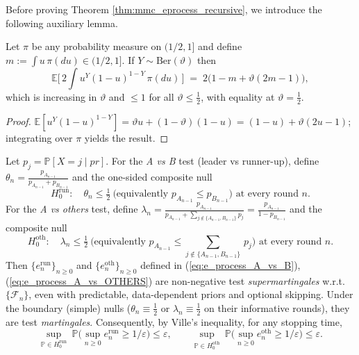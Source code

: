 Before proving Theorem \ref{thm:mmc_eprocess_recursive}, we introduce the following auxiliary lemma.

\begin{lemma}\label{lem:onestep_recursive}
Let $\pi$ be any probability measure on $(1/2,1]$ and define $m:=\int u\,\pi(du)\in(1/2,1]$.
If $Y\sim\mathrm{Ber}(\vartheta)$ then
\[
\mathbb E\!\Big[\,2\!\int u^{Y}(1-u)^{1-Y}\,\pi(du)\,\Big] \;=\; 2\big(1-m+\vartheta(2m-1)\big),
\]
which is increasing in $\vartheta$ and $\le 1$ for all $\vartheta\le \tfrac12$, with equality at $\vartheta=\tfrac12$.
\end{lemma}

\begin{proof}
$\mathbb E[u^{Y}(1-u)^{1-Y}]=\vartheta u + (1-\vartheta)(1-u) = (1-u)+\vartheta(2u-1)$; integrating over $\pi$ yields the result.
\end{proof}

\begin{theorem}
Let $p_j=\mathbb P[X=j\mid pr]$. For the \emph{A vs B} test (leader vs runner-up), define
$\theta_n = \tfrac{p_{A_{n-1}}}{p_{A_{n-1}}+p_{B_{n-1}}}$ and the one-sided composite null
\[
H^{\mathrm{run}}_0:\quad \theta_n \le \tfrac12 \ \big(\text{equivalently $p_{A_{n-1}}\le p_{B_{n-1}}$}\big) \,\,\text{at every round $n$.}
\]
For the \emph{A vs others} test, define
$\lambda_n = \tfrac{p_{A_{n-1}}}{p_{A_{n-1}}+\sum_{j\notin\{A_{n-1},B_{n-1}\}}p_j} = \tfrac{p_{A_{n-1}}}{1-p_{B_{n-1}}}$
and the composite null
\[
H^{\mathrm{oth}}_0:\quad \lambda_n \le \tfrac12 \ \big(\text{equivalently $p_{A_{n-1}}\le \scriptstyle{\sum_{j\notin\{A_{n-1},B_{n-1}\}}}$$\, p_j$}\big) \,\,\text{at every round $n$.}
\]
Then $\{e^{\mathrm{run}}_n\}_{n\ge0}$ and $\{e^{\mathrm{oth}}_n\}_{n\ge0}$ defined in (\ref{eq:e_process_A_vs_B}), (\ref{eq:e_process_A_vs_OTHERS}) are non-negative test
\emph{supermartingales} w.r.t.\ $\{\mathcal F_n\}$, even with predictable, data-dependent priors and optional skipping.
Under the boundary (simple) nulls ($\theta_n\equiv\tfrac12$ or $\lambda_n\equiv\tfrac12$ on their informative rounds),
they are test \emph{martingales}. Consequently, by Ville’s inequality, for any stopping time,
\[
\sup_{\mathbb P\in H^{\mathrm{run}}_0}\ \mathbb P\Big(\sup_{n\ge0}e^{\mathrm{run}}_n\ge 1/\varepsilon\Big)\le\varepsilon,
\qquad
\sup_{\mathbb P\in H^{\mathrm{oth}}_0}\ \mathbb P\Big(\sup_{n\ge0}e^{\mathrm{oth}}_n\ge 1/\varepsilon\Big)\le\varepsilon.
\]
\end{theorem}

